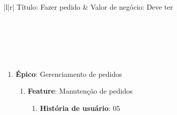 \begin{table}[!hb]
\centering
\label{h04}
\begin{tabular}{|l|r|}
\hline
Título: Fazer pedido                                                          & Valor de negócio: Deve ter                                                         \\ \hline
{}                                                                                                                        \\ \hline
{}                                                                                                           \\ \hline
{}                                                                                           \\ \hline
{} \\ \hline
{}                                                                                                                                      \\ \hline
\end{tabular}
\caption{História de usuário 04}
\end{table}

\begin{enumerate}
	\item \textbf{Épico}: Gerenciamento de pedidos
	\begin{enumerate}
		\item \textbf{Feature}: Manutenção de pedidos
		\begin{enumerate}
		\item \textbf{História de usuário}: 05
		\end{enumerate}
	\end{enumerate}
\end{enumerate}

